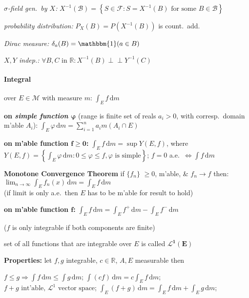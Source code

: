 \documentclass[8pt,twoside]{extarticle}
\newcommand{\indep}{\perp \!\!\! \perp}
\begin{document}
\begin{multicols}{2}
\textit{$\sigma$-field gen.\ by $X$:} $X^{-1}(\mathcal{B}){=} \left\{S{\in}\mathcal{F}: S{=}X^{-1}(B) \text{ for some } B {\in} \mathcal{B}\right\}$

\textit{probability distribution:} $P_X(B) = P(X^{-1}(B))$ is count.\ add.\

\textit{Dirac measure:} $\delta_a(B) = \mathbbm{1}(a\in B)$

\textit{$X,Y$ indep.:} $\forall B,C \text{ in } \mathbb{R}:  X^{-1}(B) \indep Y^{-1}(C)$



\paragraph{Integral} over $E \in \mathcal{M}$ with measure $m$: $\int_E f \,\mathrm{d}m$

\textbf{on \textit{simple function} $\boldsymbol{\varphi}$} (range is finite set of reals $a_i>0$, with corresp.\ domain m'able $A_i$): $\int_E \varphi \,\mathrm{d}m = \sum_{i=1}^n a_i m(A_i\cap E)$

\textbf{on m'able function $\boldsymbol{f\geq 0}$:} $\int_E f \, \mathrm{d}m = \sup Y(E,f)$, where 
$Y(E,f)=\left\{ \int_E \varphi\,\mathrm{d}m:0\leq \varphi\leq f, \varphi \text{ is simple}\right\}$; $f{=}0$ a.e.\ $\Leftrightarrow \int\! f \,\mathrm{d} m$


\textbf{Monotone Convergence Theorem} if $\{f_n\}$ $\geq 0$, m'able,  \& $f_n \to f$ then: $\lim_{n\to\infty}\int_E f_n(x)\, \mathrm{d}m = \int_E f\,\mathrm{d}m$ \\ (if limit is only a.e.\ then $E$ has to be m'able for result to hold)

\textbf{on m'able function $\boldsymbol{f}$:} $\int_E f\, \mathrm{d}m = \int_E f^+\, \mathrm{d}m - \int_E f^-\, \mathrm{d}m $

($f$ is only integrable if both components are finite)

set of all functions that are integrable over $E$ is called $\boldsymbol{\mathcal{L}^1(E)}$

\textbf{Properties:} let $f,g$ integrable, $c\in\mathbb{R}$, $A,E$ measurable then

$f\leq g \Rightarrow \int f \, \mathrm{d}m \leq \int g \, \mathrm{d}m$; 
$\int (cf) \, \mathrm{d}m = c \int_E f \, \mathrm{d}m$;
$f{+}g \text{ int'able, } \mathcal{L}^1 \text{ vector space}$; 
$\int_E (f{+}g) \, \mathrm{d}m {=} \int_E f \, \mathrm{d}m {+} \int_E g \, \mathrm{d}m$;


\end{multicols}
\end{document}
